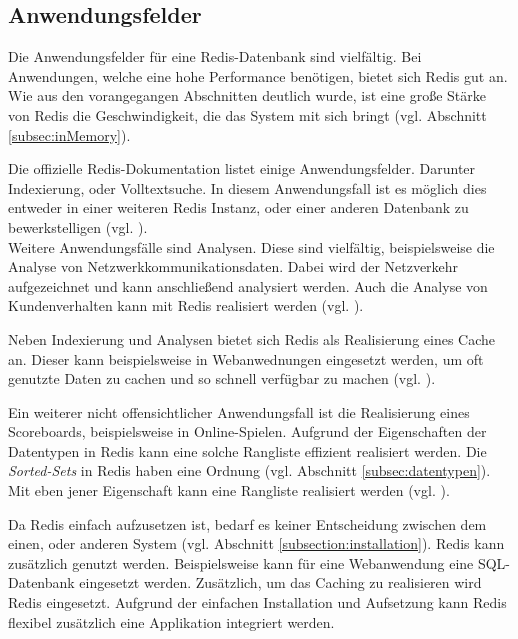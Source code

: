 
\subsection{Anwendungsfelder}
Die Anwendungsfelder für eine \acs{Redis}-Datenbank sind vielfältig. Bei Anwendungen, welche eine hohe Performance benötigen, bietet sich \acs{Redis} gut an. Wie aus den vorangegangen Abschnitten deutlich wurde, ist eine große Stärke von \acs{Redis} die Geschwindigkeit, die das System mit sich bringt (vgl. Abschnitt \ref{subsec:inMemory}).

Die offizielle \acs{Redis}-Dokumentation listet einige Anwendungsfelder. Darunter Indexierung, oder Volltextsuche. In diesem Anwendungsfall ist es möglich dies entweder in einer weiteren \acs{Redis} Instanz, oder einer anderen Datenbank zu bewerkstelligen (vgl. \cite{Redis-Docs-Anwen}).
\\Weitere Anwendungsfälle sind Analysen. Diese sind vielfältig, beispielsweise die Analyse von Netzwerkkommunikationsdaten. Dabei wird der Netzverkehr aufgezeichnet und kann anschließend analysiert werden. Auch die Analyse von Kundenverhalten kann mit \acs{Redis} realisiert werden (vgl. \cite{Redis-Docs-Anwen}).

Neben Indexierung und Analysen bietet sich \acs{Redis} als Realisierung eines Cache an. Dieser kann beispielsweise in Webanwednungen eingesetzt werden, um oft genutzte Daten zu cachen und so schnell verfügbar zu machen (vgl. \cite{Redis-Docs-cache}).

Ein weiterer nicht offensichtlicher Anwendungsfall ist die Realisierung eines Scoreboards, beispielsweise in Online-Spielen. Aufgrund der Eigenschaften der Datentypen in \acs{Redis} kann eine solche Rangliste effizient realisiert werden. Die \textit{Sorted-Sets} in \acs{Redis} haben eine Ordnung (vgl. Abschnitt \ref{subsec:datentypen}). Mit eben jener Eigenschaft kann eine Rangliste realisiert werden (vgl. \cite{Redis-Docs-leaderboard}).

Da \acs{Redis} einfach aufzusetzen ist, bedarf es keiner Entscheidung zwischen dem einen, oder anderen System (vgl. Abschnitt \ref{subsection:installation}). \acs{Redis} kann zusätzlich genutzt werden. Beispielsweise kann für eine Webanwendung eine SQL-Datenbank eingesetzt werden. Zusätzlich, um das Caching zu realisieren wird \acs{Redis} eingesetzt. Aufgrund der einfachen Installation und Aufsetzung kann \acs{Redis} flexibel zusätzlich eine Applikation integriert werden.
